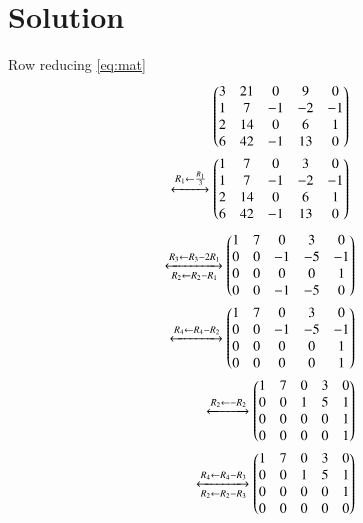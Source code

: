 \documentclass[journal,12pt,twocolumn]{IEEEtran}
\begin{document}
\section{Solution}
Row reducing \eqref{eq:mat}
\begin{align}
\begin{pmatrix}3&21&0&9&0\\1&7&-1&-2&-1\\2&14&0&6&1\\6&42&-1&13&0\end{pmatrix} \nonumber\\
\xleftrightarrow[]{R_1\leftarrow\frac{R_1}{3}}
\begin{pmatrix}1&7&0&3&0\\1&7&-1&-2&-1\\2&14&0&6&1\\6&42&-1&13&0\end{pmatrix} \nonumber
\end{align}
\begin{align}
\xleftrightarrow[R_2\leftarrow R_2-R_1]{R_3\leftarrow R_3-2R_1}\begin{pmatrix}1&7&0&3&0\\0&0&-1&-5&-1\\0&0&0&0&1\\0&0&-1&-5&0\end{pmatrix}  \nonumber\\
\xleftrightarrow[]{R_4\leftarrow R_4-R_2}\begin{pmatrix}1&7&0&3&0\\0&0&-1&-5&-1\\0&0&0&0&1\\0&0&0&0&1\end{pmatrix}  \nonumber\\
\xleftrightarrow[]{R_2\leftarrow -R_2}\begin{pmatrix}1&7&0&3&0\\0&0&1&5&1\\0&0&0&0&1\\0&0&0&0&1\end{pmatrix}  \nonumber\\
\xleftrightarrow[R_2\leftarrow R_2-R_3]{R_4\leftarrow R_4-R_3}\begin{pmatrix}1&7&0&3&0\\0&0&1&5&1\\0&0&0&0&1\\0&0&0&0&0\end{pmatrix} \label{eq:rref}
\end{align}
\end{document}
